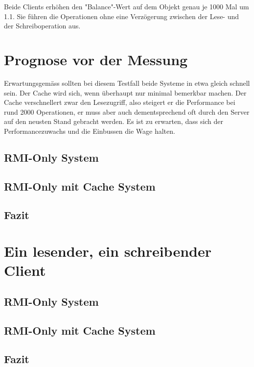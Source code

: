 Beide Clients erhöhen den "Balance"-Wert auf dem Objekt genau je 1000 Mal um 1.1. Sie führen die Operationen ohne eine Verzögerung zwischen der Lese- und der Schreiboperation aus.

\section{Prognose vor der Messung}

Erwartungsgemäss sollten bei diesem Testfall beide Systeme in etwa gleich schnell sein. Der Cache wird sich, wenn überhaupt nur minimal bemerkbar machen. Der Cache verschnellert zwar den Lesezugriff, also steigert er die Performance bei rund 2000 Operationen, er muss aber auch dementsprechend oft durch den Server auf den neusten Stand gebracht werden. Es ist zu erwarten, dass sich der Performancezuwachs und die Einbussen die Wage halten.

\subsection{RMI-Only System}

\subsection{RMI-Only mit Cache System}

\subsection{Fazit}

\section{Ein lesender, ein schreibender Client}

\subsection{RMI-Only System}

\subsection{RMI-Only mit Cache System}

\subsection{Fazit}
